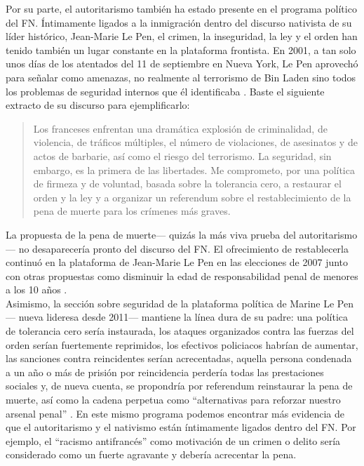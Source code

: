 Por su parte, el autoritarismo también ha estado presente en el programa político del FN. Íntimamente ligados a la inmigración dentro del discurso nativista de su líder histórico, Jean-Marie Le Pen, el crimen, la inseguridad, la ley y el orden han tenido también un lugar constante en la plataforma frontista. En 2001, a tan solo unos días de los atentados del 11 de septiembre en Nueva York, Le Pen aprovechó para señalar como amenazas, no realmente al terrorismo de Bin Laden sino todos los problemas de seguridad internos que él identificaba \parencite{ViePublique01}. Baste el siguiente extracto de su discurso para ejemplificarlo:

\begin{quote}
Los franceses enfrentan una dramática explosión de criminalidad, de violencia, de tráficos múltiples, el número de violaciones, de asesinatos y de actos de barbarie, así como el riesgo del terrorismo. La seguridad, sin embargo, es la primera de las libertades. Me comprometo, por una política de firmeza y de voluntad, basada sobre la tolerancia cero, a restaurar el orden y la ley y a organizar un referendum sobre el restablecimiento de la pena de muerte para los crímenes más graves. 
\end{quote}

La propuesta de la pena de muerte--- quizás la más viva prueba del autoritarismo--- no desaparecería pronto del discurso del FN. El ofrecimiento de restablecerla continuó en la plataforma de Jean-Marie Le Pen en las elecciones de 2007 junto con otras propuestas como disminuir la edad de responsabilidad penal de menores a los 10 años \parencite{LObs07}.\\ 

Asimismo, la sección sobre seguridad de la plataforma política de Marine Le Pen--- nueva lideresa desde 2011--- mantiene la línea dura de su padre: una política de tolerancia cero sería instaurada, los ataques organizados contra las fuerzas del orden serían fuertemente reprimidos, los efectivos policiacos habrían de aumentar, las sanciones contra reincidentes serían acrecentadas, aquella persona condenada a un año o más de prisión por reincidencia perdería todas las prestaciones sociales y, de nueva cuenta, se propondría por referendum reinstaurar la pena de muerte, así como la cadena perpetua como ``alternativas para reforzar nuestro arsenal penal'' \parencite{LePen12}. En este mismo programa podemos encontrar más evidencia de que el autoritarismo y el nativismo están íntimamente ligados dentro del FN. Por ejemplo, el ``racismo antifrancés'' como motivación de un crimen o delito sería considerado como un fuerte agravante y debería acrecentar la pena.\\

